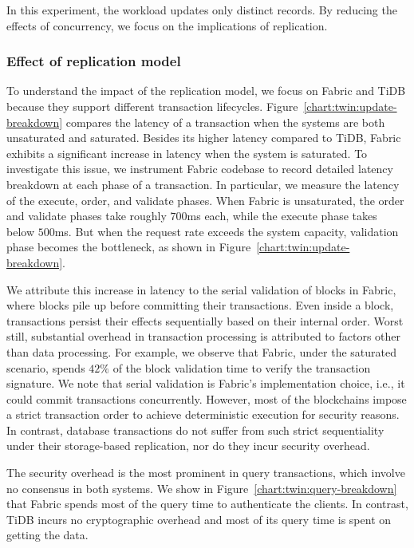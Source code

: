 In this experiment, the workload updates only distinct records. 
By reducing the effects of concurrency, we focus on the implications of replication. 

\subsubsection{Effect of replication model}
\label{ch:twin:exp:replication:model}
To understand the impact of the replication model, we focus on Fabric and TiDB
because they support different transaction lifecycles.
Figure~\ref{chart:twin:update-breakdown} compares the latency of a transaction when the
systems are both unsaturated and saturated. Besides its higher latency compared
to TiDB, Fabric exhibits a significant increase in latency when the system is
saturated. To investigate this issue, we instrument Fabric codebase to record
detailed latency breakdown at each phase of a transaction. In particular, we
measure the latency of the execute, order, and validate phases.
When Fabric is unsaturated, the order and validate phases take roughly $700$ms
each, while the execute phase takes below $500$ms.
But when the request rate exceeds the system capacity, validation phase
becomes the bottleneck, as shown in Figure~\ref{chart:twin:update-breakdown}.

We attribute this increase in latency to the serial validation of
blocks in Fabric, where blocks pile up before committing their transactions.
Even inside a block, transactions persist their effects sequentially
based on their internal order.
Worst still, substantial overhead in transaction processing is attributed to
factors other than data processing.
For example, we observe that Fabric, under the saturated scenario, spends $42\%$
of the block validation time to verify the transaction signature.
We note that serial validation is Fabric's implementation choice, i.e., it could
commit transactions concurrently.
However, most of the blockchains impose a strict transaction order to achieve
deterministic execution for security reasons.
In contrast, database transactions do not suffer from such strict sequentiality
under their storage-based replication, nor do they incur security overhead.

The security overhead is the most prominent in query transactions,
which involve no consensus in both systems.
We show in Figure~\ref{chart:twin:query-breakdown} that Fabric spends most of the query
time to authenticate the clients.
In contrast, TiDB incurs no cryptographic overhead and most of its query time is
spent on getting the data.


